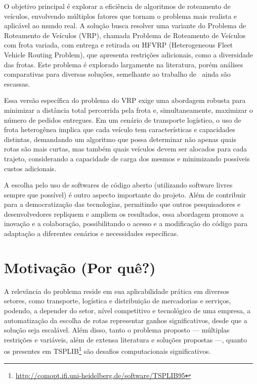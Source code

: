 \documentclass[
    openany,
    12pt,
    a4paper,
    twoside,
    english,
    brazil, sumario=tradicional
]{/home/lucas_galdino/Desktop/TCC/planning/abntex2/abntex2}
\let\oldchapter\chapter
\renewcommand{\chapter}{\clearpage\oldchapter}
\begin{document}
O objetivo principal é explorar a eficiência de algoritmos de roteamento de veículos, envolvendo múltiplos fatores que tornam o problema mais realista e aplicável ao mundo real. A solução busca resolver uma variante do Problema de Roteamento de Veículos (VRP), chamada Problema de Roteamento de Veículos com frota variada, com entrega e retirada ou HFVRP (Heterogeneous Fleet Vehicle Routing Problem), que apresenta restrições adicionais, como a diversidade das frotas. Este problema é explorado largamente na literatura, porém análises comparativas para diversas soluções, semelhante ao trabalho de~\citeauthor{voudouris_tsp_comparison} ainda são escassas.

Essa versão específica do problema do VRP exige uma abordagem robusta para minimizar a distância total percorrida pela frota e, simultaneamente, maximizar o número de pedidos entregues. Em um cenário de transporte logístico, o uso de frota heterogênea implica que cada veículo tem características e capacidades distintas, demandando um algoritmo que possa determinar não apenas quais rotas são mais curtas, mas também quais veículos devem ser alocados para cada trajeto, considerando a capacidade de carga dos mesmos e minimizando possíveis custos adicionais.

A escolha pelo uso de softwares de código aberto (utilizando software livres sempre que possível) é outro aspecto importante do projeto. Além de contribuir para a democratização das tecnologias, permitindo que outros pesquisadores e desenvolvedores repliquem e ampliem os resultados, essa abordagem promove a inovação e a colaboração, possibilitando o acesso e a modificação do código para adaptação a diferentes cenários e necessidades específicas.

\chapter{Motivação (Por quê?)}

A relevância do problema reside em sua aplicabilidade prática em diversos setores, como transporte, logística e distribuição de mercadorias e serviços, podendo, a depender do setor, nível competitivo e tecnológico de uma empresa, a automatização da escolha de rotas representar ganhos significativos, desde que a solução seja escalável. Além disso, tanto o problema proposto — múltiplas restrições e variáveis, além de extensa literatura e soluções propostas —, quanto os presentes em TSPLIB\footnote{\url{http://comopt.ifi.uni-heidelberg.de/software/TSPLIB95}} são desafios computacionais significativos.
\end{document}
